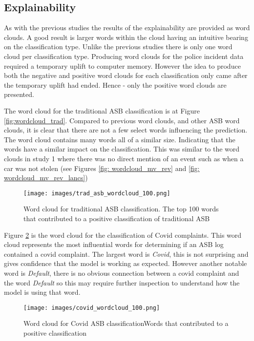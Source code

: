 \subsection{Explainability} As with the previous studies the results of the explainability are provided as word clouds. A good result is larger words within the cloud having an intuitive bearing on the classification type. Unlike the previous studies there is only one word cloud per classification type. Producing word clouds for the police incident data required a temporary uplift to computer memory. However the idea to  produce both the negative and positive word clouds for each classification only came after the temporary uplift had ended. Hence - only the positive word clouds are presented. 

The word cloud for the traditional ASB classification is at Figure \ref{fig:wordcloud_trad}. Compared to previous word clouds, and other ASB word clouds, it is clear that there are not a few select words influencing the prediction. The word cloud contains many words all of a similar size. Indicating that the words have a similar impact on the classification. This was similar to the word clouds in study 1 where there was no direct mention of an event such as when a car was not stolen (see Figures \ref{fig: wordcloud_mv_rev} and \ref{fig: wordcloud_mv_rev_lancs})

\begin{figure}[h]
    \texttt{[image: images/trad\_asb\_wordcloud\_100.png]}
    \caption[Word cloud for traditional ASB classification.]{{Word cloud for traditional ASB classification.} The top 100 words that contributed to a positive classification of traditional ASB}
    \label{fig: wordcloud_trad}
\end{figure}

Figure \ref{fig: wordcloud_covid} is the word cloud for the classification of Covid complaints. This word cloud represents the most influential words for determining if an ASB log contained a covid complaint. The largest word is \emph{Covid}, this is not surprising and gives confidence that the model is working as expected. However another notable word is \emph{Default}, there is no obvious connection between a covid complaint and the word \emph{Default}  so this may require further inspection to understand how the model is using that word.


\begin{figure}[h]
    \centering
    \texttt{[image: images/covid\_wordcloud\_100.png]}
    \caption[Word cloud for Covid ASB classification]{{Word cloud for Covid ASB classification}Words that contributed to a positive classification}
    \label{fig: wordcloud_covid}
\end{figure}

